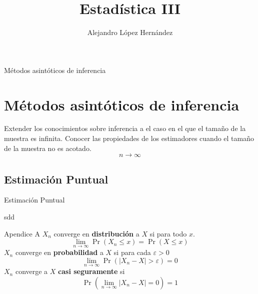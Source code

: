 \documentclass{beamer}
\author[Alejandro López]{Alejandro López Hernández}
\institute[FES Acatlán UNAM ]
{ FES Acatlán\\
  Universidad Nacional Autónoma de México }
\title{Estadística III}
\begin{document}
\frame{\titlepage}
\frame{\tableofcontents}
\begin{frame}{Métodos asintóticos de inferencia}
\section{Métodos asintóticos de inferencia}
Extender los conocimientos sobre inferencia a el caso en el que el tamaño de la muestra es infinita. Conocer las propiedades de los estimadores cuando el tamaño de la muestra no es acotado.$$n\rightarrow \infty$$
\end{frame}
\subsection{Estimación Puntual}
\begin{frame}{Estimación Puntual}

sdd
\end{frame}
\appendix
\begin{frame}{Apendice A} 
$X_n$ converge en \textbf{distribución} a $X$ si para todo $x$. $$\lim_{n\rightarrow \infty}\Pr(X_n\le x)=\Pr(X\le x)$$ $X_n$ converge en \textbf{probabilidad} a $X$ si para cada $\varepsilon>0$ $$\lim_{n\rightarrow \infty}\Pr(|X_n-X|>\varepsilon) =0$$
$X_n$ converge a $X$ \textbf{casi seguramente} si $$\Pr(\lim_{n\rightarrow \infty}|X_n-X|=0)=1$$
\end{frame}
\end{document}
